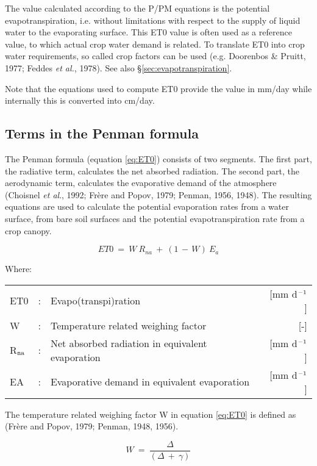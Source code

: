 The value calculated according to the P/PM equations is the potential evapotranspiration, 
i.e. without limitations with respect to the supply of liquid water to the
evaporating surface. This ET0 value is often used as a reference value, to
which actual crop water demand is related. To translate ET0 into crop water require\-ments,
so called crop factors can be used (e.g. Doorenbos \& Pruitt, 1977; Feddes {\it et al.},
1978). See also \S \ref{sec:evapotranspiration}.

Note that the equations used to compute ET0 provide the value in mm/day while internally
this is converted into cm/day.

\subsection{Terms in the Penman formula}
\label{sec:penman}

The Penman formula (equation \ref{eq:ET0}) consists of two segments. The first part, the radiative
term, calculates the net absorbed radiation. The second part, the aerodynamic term,
calculates the evapora\-tive demand of the atmo\-sphere (Choisnel {\it et al}., 1992; Fr\`{e}re and
Popov, 1979; Penman, 1956, 1948). The resulting equations are used to calculate the
potential evapora\-tion rates from a water surface, from bare soil surfaces and the potential
evapotranspira\-tion rate from a crop canopy.

\begin{equation}
\label{eq:ET0}
ET0 ~=~ W ~R _{na} ~+~(1\, -\, W) ~E _{a} 
\end{equation}

Where:\\[5pt]
\begin{tabularx}{\textwidth}{llXr}
	ET0&:& Evapo(transpi)ration & [mm d$^{{\rm -1}}$] \\
	W&:& Temperature related weighing factor &  [-] \\
	R$_{{\rm na}}$&: & Net absorbed radiation in equivalent evaporation & [mm d$^{{\rm -1}}$] \\
	EA&: &  Evaporative demand in equivalent evaporation & [mm d$^{{\rm -1}}$] \\
\end{tabularx}

The temperature related weighing factor W in equation \ref{eq:ET0} is defined as 
(Fr\`{e}re and Popov, 1979; Penman, 1948, 1956).

\begin{equation}
W ~=~{\frac{\Delta}{(\Delta ~+~ \gamma )}} 
\end{equation}

